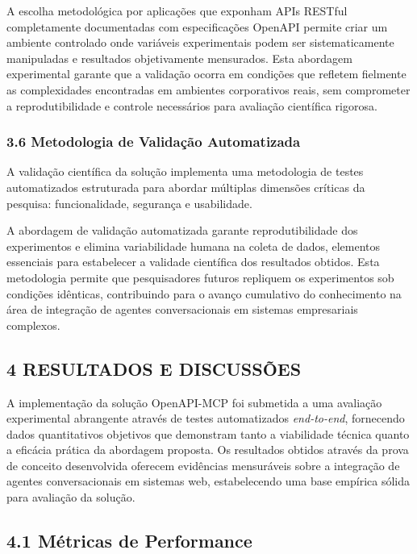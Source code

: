 \documentclass[
]{article}
\begin{document}
A escolha metodológica por aplicações que exponham APIs RESTful
completamente documentadas com especificações OpenAPI permite criar um
ambiente controlado onde variáveis experimentais podem ser
sistematicamente manipuladas e resultados objetivamente mensurados. Esta
abordagem experimental garante que a validação ocorra em condições que
refletem fielmente as complexidades encontradas em ambientes
corporativos reais, sem comprometer a reprodutibilidade e controle
necessários para avaliação científica rigorosa.

\subsubsection{3.6 Metodologia de Validação
Automatizada}\label{metodologia-de-validauxe7uxe3o-automatizada}

A validação científica da solução implementa uma metodologia de testes
automatizados estruturada para abordar múltiplas dimensões críticas da
pesquisa: funcionalidade, segurança e usabilidade.

A abordagem de validação automatizada garante reprodutibilidade dos
experimentos e elimina variabilidade humana na coleta de dados,
elementos essenciais para estabelecer a validade científica dos
resultados obtidos. Esta metodologia permite que pesquisadores futuros
repliquem os experimentos sob condições idênticas, contribuindo para o
avanço cumulativo do conhecimento na área de integração de agentes
conversacionais em sistemas empresariais complexos.

\subsection{4 RESULTADOS E DISCUSSÕES}\label{resultados-e-discussuxf5es}

A implementação da solução OpenAPI-MCP foi submetida a uma avaliação
experimental abrangente através de testes automatizados
\emph{end-to-end}, fornecendo dados quantitativos objetivos que
demonstram tanto a viabilidade técnica quanto a eficácia prática da
abordagem proposta. Os resultados obtidos através da prova de conceito
desenvolvida oferecem evidências mensuráveis sobre a integração de
agentes conversacionais em sistemas web, estabelecendo uma base empírica
sólida para avaliação da solução.

\subsection{4.1 Métricas de
Performance}\label{muxe9tricas-de-performance}
\end{document}
